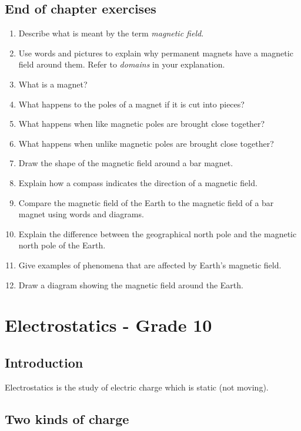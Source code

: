 \section{End of chapter exercises}
\begin{enumerate}
\item Describe what is meant by the term \textit{magnetic field}.
\item Use words and pictures to explain why permanent magnets have a magnetic field around them. Refer to \textit{domains} in your explanation.
\item What is a magnet?
\item What happens to the poles of a magnet if it is cut into pieces?
\item What happens when like magnetic poles are brought close together?
\item What happens when unlike magnetic poles are brought close together?
\item Draw the shape of the magnetic field around a bar magnet.
\item Explain how a compass indicates the direction of a magnetic field.
\item Compare the magnetic field of the Earth to the magnetic field of a bar magnet using words and diagrams.
\item Explain the difference between the geographical north pole and the magnetic north pole of the Earth.
\item Give examples of phenomena that are affected by Earth's magnetic field.
\item Draw a diagram showing the magnetic field around the Earth.
\end{enumerate}





\chapter{Electrostatics - Grade 10}
\label{p:em:es10}

\section{Introduction}
Electrostatics is the study of electric charge which is static (not moving).

\section{Two kinds of charge}


